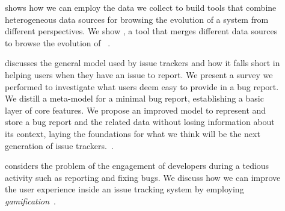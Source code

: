 \begin{description}

  \item[] shows how we can employ the data we collect to build tools that combine heterogeneous data sources for browsing the evolution of a system from different perspectives.
  We show \blend, a tool that merges different data sources to browse the evolution of \pha~\cite{DalS2015b}.



  \item[] discusses the general model used by issue trackers and how it falls short in helping users when they have an issue to report.
  We present a survey we performed to investigate what users deem easy to provide in a bug report.
  We distill a meta-model for a minimal bug report, establishing a basic layer of core features.
  We propose an improved model to represent and store a bug report and the related data without losing information about its context, laying the foundations for what we think will be the next generation of issue trackers.~\cite{DalS2016a}.



  \item[] considers the problem of the engagement of developers during a tedious activity such as reporting and fixing bugs.
  We discuss how we can improve the user experience inside an issue tracking system by employing \emph{gamification}~\cite{DalS2017a}.



\end{description}
